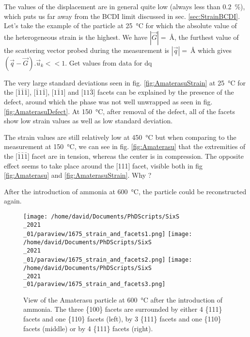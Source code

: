 The values of the displacement are in general quite low (always less than \qty{0.2}{\percent}), which puts us far away from the BCDI limit discussed in sec. \ref{sec:StrainBCDI}.
Let's take the example of the particle at \qty{25}{\degreeCelsius} for which the absolute value of the heterogeneous strain is the highest.
We have $|\vec{G}| = \qty{}{\angstrom}$, the furthest value of the scattering vector probed during the measurement is $|\vec{q}| = \qty{}{\angstrom}$ which gives $(\vec{q}-\vec{G}).\vec{u}_k<<1$.
\textcolor{Important}{Get values from data for dq}

The very large standard deviations seen in fig. \ref{fig:AmaterasuStrain} at \qty{25}{\degreeCelsius} for the [$\bar{1}\bar{1}\bar{1}$], [$\bar{1}1\bar{1}$], [$1\bar{1}1$] and [$11\bar{3}$] facets can be explained by the presence of the defect, around which the phase was not well unwrapped as seen in fig. \ref{fig:AmaterasuDefect}.
At \qty{150}{\degreeCelsius}, after removal of the defect, all of the facets show low strain values as well as low standard deviation.

The strain values are still relatively low at \qty{450}{\degreeCelsius} but when comparing to the measurement at \qty{150}{\degreeCelsius}, we can see in fig. \ref{fig:Amaterasu} that the extremities of the [$\bar{1}\bar{1}\bar{1}$] facet are in tension, whereas the center is in compression.
The opposite effect seems to take place around the [111] facet, visible both in fig \ref{fig:Amaterasu} and \ref{fig:AmaterasuStrain}.
\textcolor{Important}{Why ?}

After the introduction of ammonia at \qty{600}{\degreeCelsius}, the particle could be reconstructed again.

\begin{figure}[!htb]
    \centering
    \texttt{[image: /home/david/Documents/PhDScripts/SixS\\\_2021\\\_01/paraview/1675\_strain\_and\_facets1.png]}
    \texttt{[image: /home/david/Documents/PhDScripts/SixS\\\_2021\\\_01/paraview/1675\_strain\_and\_facets2.png]}
    \texttt{[image: /home/david/Documents/PhDScripts/SixS\\\_2021\\\_01/paraview/1675\_strain\_and\_facets3.png]}
    \caption{
        View of the Amaterasu particle at \qty{600}{\degreeCelsius} after the introduction of ammonia.
        The three \{100\} facets are surrounded by either 4 \{111\} facets and one \{110\} facets (left), by 3 \{111\} facets and one \{110\} facets (middle) or by 4 \{111\} facets (right).
    }
    \label{fig:AmaterasuStrain1675}
\end{figure}

